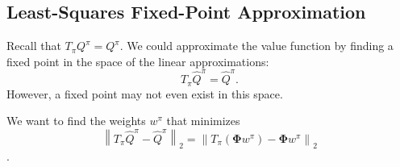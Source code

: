 \documentclass{article}
\newcommand{\norm}[1]{\left\|#1\right\|}
\begin{document}

\subsection*{Least-Squares Fixed-Point Approximation} %
\label{sub:least_squares_fixed_point_approximation}

Recall that $T_{\pi}Q^{\pi}=Q^{\pi}$. We could approximate the value function by finding a fixed point in the space of the linear approximations:
\[
	T_{\pi}\hat{Q}^{\pi}= \hat{Q}^{\pi}.
\]
However, a fixed point may not even exist in this space. 

We want to find the weights $w^{\pi}$ that minimizes 
$$\norm{T_{\pi}\hat{Q}^{\pi}-\hat{Q}^{\pi}}_{2}
	=\norm{T_{\pi}(\mathbf{\Phi}w^{\pi})-\mathbf{\Phi}w^{\pi}}_{2}$$.




\end{document}

